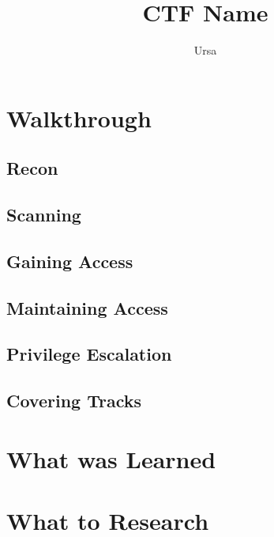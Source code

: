 \documentclass{scrartcl}
\title{CTF Name}
\author{Ursa}
\begin{document}
\maketitle
{}
\paragraph{}

\tableofcontents
\pagebreak

\section{Walkthrough}
\label{sec:walk}

\subsection{Recon}

\subsection{Scanning}

\subsection{Gaining Access}

\subsection{Maintaining Access}

\subsection{Privilege Escalation}

\subsection{Covering Tracks}

\section{What was Learned}
\label{sec:learn}

\section{What to Research}
\label{research}


\label{sec:conclusion}

\label{sec:resource}
\end{document}
